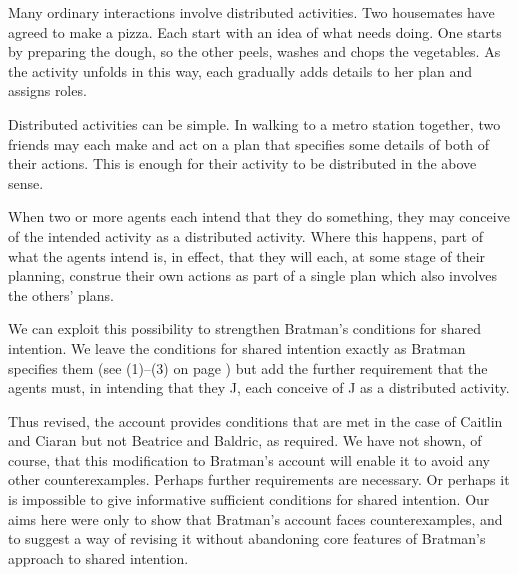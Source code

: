 \documentclass[12pt,\papersize]{extarticle}
\begin{document}
Many ordinary interactions involve distributed activities.
Two housemates have agreed to make a pizza. 
Each start with an idea of what needs doing.
One starts by preparing the dough, so the other peels, washes and chops the vegetables.
As the activity unfolds in this way, each gradually adds details to her plan and assigns roles. 

Distributed activities can be simple.
In walking to a metro station together,
two friends may each make and act on a plan that specifies some details of both of their actions.
This is enough for their activity to be distributed in the above sense.

When two or more agents each intend that they do something, 
they may conceive of the intended activity as a distributed activity.
Where this happens, part of what the agents intend is, in effect, that they will each, at some stage of their planning, construe their own actions as part of a single plan which also involves the others' plans.

We can exploit this possibility %
to strengthen Bratman's conditions for shared intention.
We leave the conditions for shared intention exactly as Bratman specifies them (see (1)--(3) on page \pageref{quote:bratman_account})
but add the further requirement that the agents must, in intending that they J, each conceive of J as a distributed activity.

Thus revised, the account provides conditions that are met in the case of Caitlin and Ciaran but not Beatrice and Baldric, as required.
We have not shown, of course, that this modification to Bratman's account will enable it to avoid any other counterexamples.
Perhaps further requirements are necessary.
Or perhaps it is impossible to give informative sufficient conditions for shared intention.
Our aims here were only 
		to show that Bratman's account faces counterexamples,
	and 
		to suggest a way of revising it without abandoning core features of Bratman's approach to shared intention.
		
\end{document}
